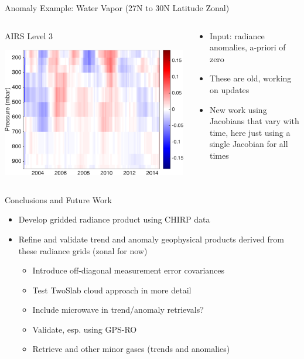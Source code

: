 \documentclass[10pt,t]{beamer}
\begin{document}
\begin{frame}[label={sec:org77a5847}]{Anomaly Example: Water Vapor (27N to 30N Latitude Zonal)}
\vspace{-0.15in}
\begin{columns}
\begin{column}{0.55\columnwidth}
\begin{block}{\footnotesize AIRS Level 3}
\vspace{-0.1in}
\begin{center}
\includegraphics[width=0.8\linewidth]{./oFigs/water_lati_30_L3.png}
\end{center}
\end{block}
\end{column}

\begin{column}{0.55\columnwidth}
\begin{block}{\footnotesize}
\small
\begin{itemize}
\item Input: radiance anomalies, a-priori of zero
\item These are old, working on updates
\item New work using Jacobians that vary with time, here just using a single Jacobian for all times
\end{itemize}
\end{block}
\end{column}
\end{columns}
\end{frame}

\begin{frame}[label={sec:org1792a1b}]{Conclusions and Future Work}
\begin{itemize}
\item Develop gridded radiance product using CHIRP data
\item Refine and validate trend and anomaly geophysical products derived from these radiance grids (zonal for now)
\begin{itemize}
\item Introduce off-diagonal measurement error covariances
\item Test TwoSlab cloud approach in more detail
\item Include microwave in trend/anomaly retrievals?
\item Validate, esp. using GPS-RO
\item Retrieve \cd and other minor gases (trends and anomalies)
\end{itemize}
\end{itemize}
\end{frame}
\end{document}
